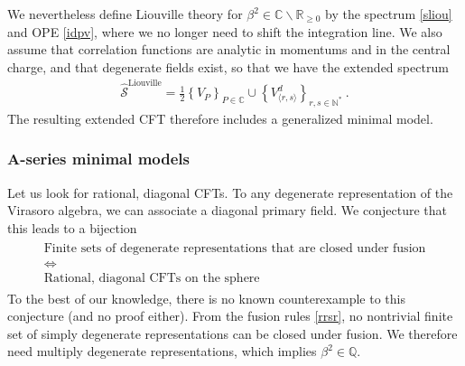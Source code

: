 \documentclass[12pt, a4paper]{article}
\theoremstyle{break}
\begin{document}
We nevertheless define Liouville theory for $\beta^2\in \mathbb{C}\backslash\mathbb{R}_{\geq 0}$ by the spectrum \eqref{sliou} and OPE \eqref{idpv}, where we no longer need to shift the integration line. 
We also assume that correlation functions are analytic in momentums and in the central charge, and that degenerate fields exist, so that we have the extended spectrum
\begin{align}
 \boxed{ \widehat{\mathcal{S}}^\text{Liouville} = \frac12 \left\{ V_P\right\}_{P\in \mathbb{C}} \cup \left\{ V^d_{\langle r,s\rangle}\right\}_{r,s\in\mathbb{N}^*} }\ .
 \label{stliou}
\end{align}
The resulting extended CFT therefore includes a generalized minimal model. 


\subsubsection{A-series minimal models}\label{sec:amm}

Let us look for rational, diagonal CFTs. 
To any degenerate representation of the Virasoro algebra, we can associate a diagonal primary field. We conjecture that this leads to a bijection 
\begin{align}
\begin{array}{c}
 \text{Finite sets of degenerate representations that are closed under fusion}
 \\
 \iff 
 \\
 \text{Rational, diagonal CFTs on the sphere}
\end{array}
\end{align}
To the best of our knowledge, there is no known counterexample to this conjecture (and no proof either). 
From the fusion rules \eqref{rrsr}, no nontrivial finite set of simply degenerate representations can be closed under fusion. We therefore need multiply degenerate representations, which implies $\beta^2\in\mathbb{Q}$.  
\end{document}
